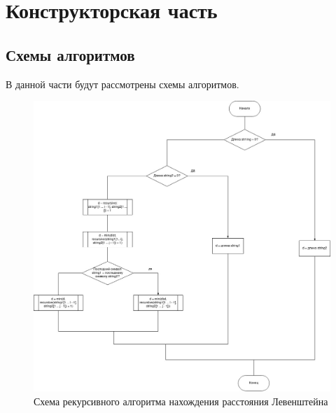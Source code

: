 \documentclass[12pt]{report}
\begin{document}
\clearpage

\chapter{Конструкторская часть}

\section{Схемы алгоритмов}
В данной части будут рассмотрены схемы алгоритмов.

\begin{figure}[h]
	\centering
	\includegraphics[width=0.75\linewidth]{rec.jpg}
	\caption{Схема рекурсивного алгоритма нахождения расстояния Левенштейна}
	\label{fig:mpr}
\end{figure}
\end{document}

